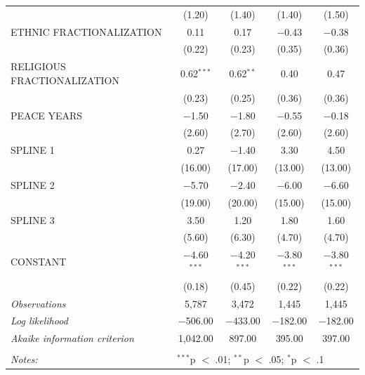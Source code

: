 \documentclass[11pt,article,oneside]{memoir}
\begin{document}
\begin{table}[!htbp]
\begin{tabular}{@{\extracolsep{5pt}}lcccc}
  & (1.20) & (1.40) & (1.40) & (1.50) \\ 
  ETHNIC FRACTIONALIZATION & 0.11 & 0.17 & $-$0.43 & $-$0.38 \\ 
  & (0.22) & (0.23) & (0.35) & (0.36) \\ 
  RELIGIOUS FRACTIONALIZATION & 0.62$^{***}$ & 0.62$^{**}$ & 0.40 & 0.47 \\ 
  & (0.23) & (0.25) & (0.36) & (0.36) \\ 
  PEACE YEARS & $-$1.50 & $-$1.80 & $-$0.55 & $-$0.18 \\ 
  & (2.60) & (2.70) & (2.60) & (2.60) \\ 
  SPLINE 1 & 0.27 & $-$1.40 & 3.30 & 4.50 \\ 
  & (16.00) & (17.00) & (13.00) & (13.00) \\ 
  SPLINE 2 & $-$5.70 & $-$2.40 & $-$6.00 & $-$6.60 \\ 
  & (19.00) & (20.00) & (15.00) & (15.00) \\ 
  SPLINE 3 & 3.50 & 1.20 & 1.80 & 1.60 \\ 
  & (5.60) & (6.30) & (4.70) & (4.70) \\ 
  CONSTANT & $-$4.60$^{***}$ & $-$4.20$^{***}$ & $-$3.80$^{***}$ & $-$3.80$^{***}$ \\ 
  & (0.18) & (0.45) & (0.22) & (0.22) \\ 
 \textit{Observations} & 5,787 & 3,472 & 1,445 & 1,445 \\ 
\textit{Log likelihood} & $-$506.00 & $-$433.00 & $-$182.00 & $-$182.00 \\ 
\textit{Akaike information criterion} & 1,042.00 & 897.00 & 395.00 & 397.00 \\ 
\hline \\[-1.8ex] 
\textit{Notes:} & \multicolumn{4}{l}{$^{***}$p $<$ .01; $^{**}$p $<$ .05; $^{*}$p $<$ .1} \\ 
\end{tabular} 
\end{table}

\clearpage
\end{document}
